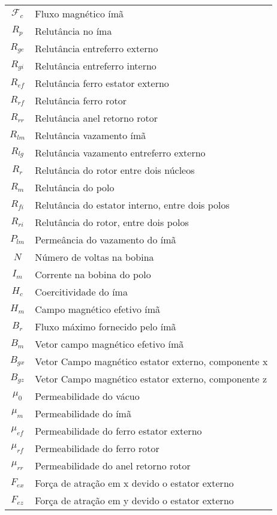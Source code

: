 \begin{longtable}{c l}
	$\mathcal{F}_c$ & Fluxo magnético ímã 				\\
	$R_{p}$			& Relutância no íma 				\\
	$R_{ge}$		& Relutância entreferro externo 	\\
	$R_{gi}$		& Relutância entreferro interno \\
	$R_{ef}$		& Relutância ferro estator externo 	\\
	$R_{rf}$		& Relutância ferro rotor 			\\
	$R_{rr}$		& Relutância anel retorno rotor 	\\
	$R_{lm}$		& Relutância vazamento ímã 			\\
	$R_{lg}$		& Relutância vazamento entreferro externo \\
	$R_{r}$			& Relutância do rotor entre dois núcleos \\
	$R_m$			& Relutância do polo \\
	$R_{fi}$		& Relutância do estator interno, entre dois polos\\
	$R_{ri}$		& Relutância do rotor, entre dois polos \\

	$P_{lm}$		& Permeância do vazamento do ímã	\\

	$N$				& Número de voltas na bobina \\
	$I_m$			& Corrente na bobina do polo \\	

	$H_c$			& Coercitividade do íma \\
	$H_m$			& Campo magnético efetivo ímã \\

	$B_r$ 			& Fluxo máximo fornecido pelo ímã \\
	$B_m$			& Vetor campo magnético efetivo ímã \\
	$B_{gx}$		& Vetor Campo magnético estator externo, componente x \\
	$B_{gz}$		& Vetor Campo magnético estator externo, componente z \\

	$\mu_0$			& Permeabilidade do vácuo \\
	$\mu_m$			& Permeabilidade do ímã \\
	$\mu_{ef}$		& Permeabilidade do ferro estator externo \\
	$\mu_{rf}$		& Permeabilidade do ferro rotor \\
	$\mu_{rr}$		& Permeabilidade do anel retorno rotor\\

	$F_{ex}$		& Força de atração em x devido o estator externo \\
	$F_{ez}$		& Força de atração em y devido o estator externo \\

\end{longtable} 
